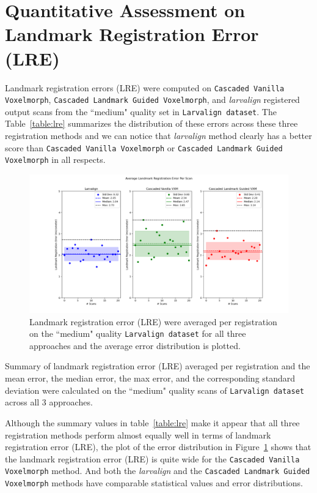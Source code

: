 \documentclass{book}
\begin{document}
	\section{Quantitative Assessment on Landmark Registration Error (LRE)}
	Landmark registration errors (LRE) were computed on \texttt{Cascaded Vanilla Voxelmorph}, \texttt{Cascaded Landmark Guided Voxelmorph}, and \textit{larvalign} registered output scans from the ``medium" quality set in \texttt{Larvalign dataset}. The Table~\ref{table:lre} summarizes the distribution of these errors across these three registration methods and we can notice that \textit{larvalign} method clearly has a better score than \texttt{Cascaded Vanilla Voxelmorph} or \texttt{Cascaded Landmark Guided Voxelmorph} in all respects. 
	
	\begin{figure}[h!]
		\centering
		\includegraphics[width=0.9\columnwidth]{resources/chapter5_fresh/stats_per_scan_output/Stats_Per_Landmark.png}
		\caption{Landmark registration error (LRE) were averaged per registration on the ``medium" quality \texttt{Larvalign dataset} for all three approaches and the average error distribution is plotted.}
		\label{fig:mean_stats_per_scan}
	\end{figure}

	\begin{table}[h!]
		\centering
		
		\caption{Summary of landmark registration error (LRE) averaged per registration and the mean error, the median error, the max error, and the corresponding standard deviation were calculated on the ``medium" quality scans of \texttt{Larvalign dataset} across all 3 approaches.}
		\label{table:lre}
	\end{table}
	
	Although the summary values in table~\ref{table:lre} make it appear that all three registration methods perform almost equally well in terms of landmark registration error (LRE), the plot of the error distribution in Figure~\ref{fig:mean_stats_per_scan} shows that the landmark registration error (LRE) is quite wide for the \texttt{Cascaded Vanilla Voxelmorph} method. And both the \textit{larvalign} and the \texttt{Cascaded Landmark Guided Voxelmorph} methods have comparable statistical values and error distributions.
	
\end{document}
